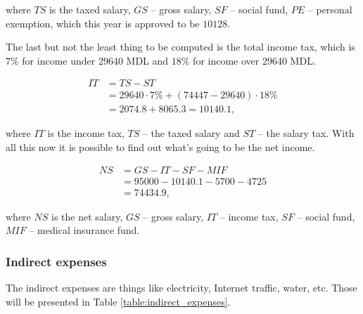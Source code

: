\noindent
where $TS$ is the taxed salary, $GS$ -- gross salary, $SF$ -- social fund, $PE$ -- personal exemption, which this year is approved to be $10128$.

The last but not the least thing to be computed is the total income tax, which is $7\%$ for income under 29640 MDL and $18\%$ for income over 29640 MDL.

\begin{equation}
\begin{split}
 IT &= TS - ST \\
      &= 29640 \cdot 7\% + (74447 - 29640) \cdot 18\% \\
      & = 2074.8 + 8065.3 = 10140.1,
 \end{split}
\end{equation}

\noindent
where $IT$ is the income tax, $TS$ -- the taxed salary and $ST$ -- the salary tax. With all this now it is possible to find out what's going to be the net income.

\begin{equation}
\begin{split}
 NS &= GS - IT - SF - MIF \\
            &= 95000 - 10140.1 - 5700 - 4725 \\
            &= 74434.9,
\end{split}
\end{equation}

\noindent
where $NS$ is the net salary, $GS$ -- gross salary, $IT$ -- income tax, $SF$ -- social fund, $MIF$ -- medical insurance fund.

\subsubsection{Indirect expenses}
The indirect expenses are things like electricity, Internet traffic, water, etc. Those will be presented in Table \ref{table:indirect_expenses}.

